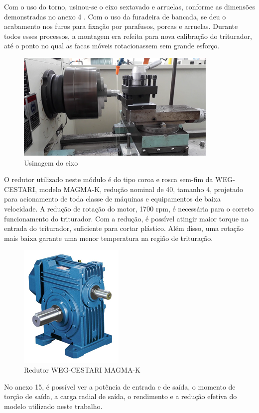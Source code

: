 Com o uso do torno, usinou-se o eixo sextavado e arruelas, conforme as dimensões demonstradas no anexo 4 . Com o uso da furadeira de bancada, se deu o acabamento nos furos para fixação por parafusos, porcas e arruelas. Durante todos esses processos, a montagem era refeita para nova calibração do triturador, até o ponto no qual as facas móveis rotacionassem sem grande esforço.

\begin{figure}[!h]
	\centering
		\includegraphics[scale=0.7]{figuras/estrutura/15.png}
	\caption{Usinagem do eixo}
\end{figure}

O redutor utilizado neste módulo é do tipo coroa e rosca sem-fim da WEG-CESTARI, modelo MAGMA-K, redução nominal de 40, tamanho 4, projetado para acionamento de toda classe de máquinas e equipamentos de baixa velocidade. A redução de rotação do motor, 1700 rpm, é necessária para o correto funcionamento do triturador. Com a redução, é possível atingir maior torque na entrada do triturador, suficiente para cortar plástico. Além disso, uma rotação mais baixa garante uma menor temperatura na região de trituração. 

\begin{figure}[!h]
	\centering
		\includegraphics[scale=0.4]{figuras/estrutura/16.png}
	\caption{Redutor WEG-CESTARI MAGMA-K}
\end{figure}

No anexo 15, é possível ver a potência de entrada e de saída, o momento de torção de saída, a carga radial de saída, o rendimento e a redução efetiva do modelo utilizado neste trabalho.

